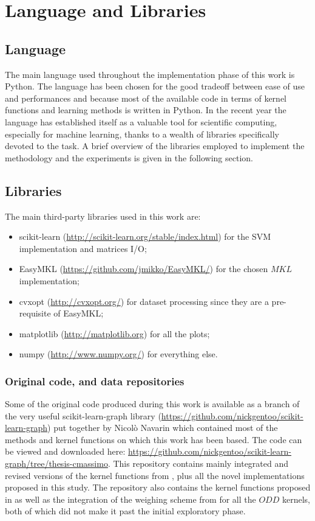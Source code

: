 \chapter{Language and Libraries}
\label{AppendixB}

\section{Language}
\label{sec:language}

The main language used throughout the implementation phase of this work is 
Python.
The language has been chosen for the good tradeoff between ease of use and
performances and because most of the available code in terms of kernel functions 
and learning methods is written in Python.
In the recent year the language has established itself as a valuable tool for
scientific computing, especially for machine learning, thanks to a wealth
of libraries specifically devoted to the task.
A brief overview of the libraries employed to implement the methodology
and the experiments is given in the following section.

\section{Libraries}
\label{sec:libraries}
The main third-party libraries used in this work are:
\begin{itemize}
    \item scikit-learn (\url{http://scikit-learn.org/stable/index.html}) for the
        SVM implementation and matrices I/O;
    \item EasyMKL (\url{https://github.com/jmikko/EasyMKL/}) for the chosen $MKL$
        implementation;
    \item cvxopt (\url{http://cvxopt.org/}) for dataset processing since they are
        a pre-requisite of EasyMKL;
    \item matplotlib (\url{http://matplotlib.org}) \cite{Hunter:2007} for all the plots;
    \item numpy (\url{http://www.numpy.org/}) for everything else.
\end{itemize}

\subsection{Original code, and data repositories}
\label{subsec:repos}
Some of the original code produced during this work is available as a branch of the 
very useful scikit-learn-graph library (\url{https://github.com/nickgentoo/scikit-learn-graph})
put together by Nicol\`o Navarin which contained most of the methods and kernel
functions on which this work has been based.
The code can be viewed and downloaded here: \url{https://github.com/nickgentoo/scikit-learn-graph/tree/thesis-cmassimo}.
This repository contains mainly integrated and revised versions of the kernel functions from \cite{rtesselli},
plus all the novel implementations proposed in this study.
The repository also contains the kernel functions proposed in \cite{SanMartino2014}
as well as the integration of the weighing scheme from \cite{DaSanMartino2016} for all the $ODD$ kernels,
both of which did not make it past the initial exploratory phase.

